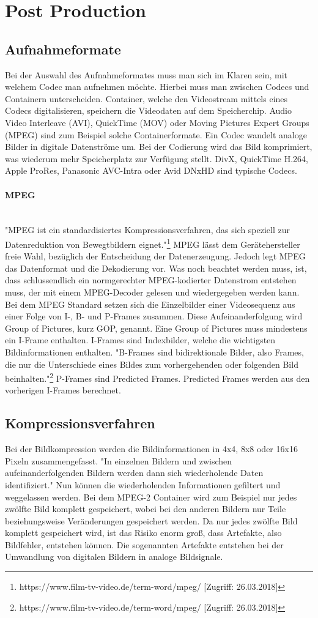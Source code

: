 \section{Post Production}
\subsection{Aufnahmeformate}
Bei der Auswahl des Aufnahmeformates muss man sich im Klaren sein, mit welchem Codec man aufnehmen möchte. Hierbei muss man zwischen Codecs und Containern unterscheiden. Container, welche den Videostream mittels eines Codecs digitalisieren, speichern die Videodaten auf dem Speicherchip. Audio Video Interleave (AVI), QuickTime (MOV) oder Moving Pictures Expert Groups (MPEG) sind zum Beispiel solche Containerformate. Ein Codec wandelt analoge Bilder in digitale Datenströme um. Bei der Codierung wird das Bild komprimiert, was wiederum mehr Speicherplatz zur Verfügung stellt. DivX, QuickTime H.264, Apple ProRes, Panasonic AVC-Intra oder Avid DNxHD sind typische Codecs. 
\paragraph{MPEG}
\leavevmode \\
"MPEG ist ein standardisiertes Kompressionsverfahren, das sich speziell zur Datenreduktion von Bewegtbildern eignet."\footnote{\label{}https://www.film-tv-video.de/term-word/mpeg/ [Zugriff: 26.03.2018]} MPEG lässt dem Gerätehersteller freie Wahl, bezüglich der Entscheidung der Datenerzeugung. Jedoch legt MPEG das Datenformat und die Dekodierung vor. Was noch beachtet werden muss, ist, dass schlussendlich ein normgerechter MPEG-kodierter Datenstrom entstehen muss, der mit einem MPEG-Decoder gelesen und wiedergegeben werden kann. Bei dem MPEG Standard setzen sich die Einzelbilder einer Videosequenz aus einer Folge von I-, B- und P-Frames zusammen. Diese Aufeinanderfolgung wird Group of Pictures, kurz GOP, genannt. Eine Group of Pictures muss mindestens ein I-Frame enthalten. I-Frames sind Indexbilder, welche die wichtigsten Bildinformationen enthalten. "B-Frames sind  bidirektionale Bilder, also Frames, die nur die Unterschiede eines Bildes zum vorhergehenden oder folgenden Bild beinhalten."\footnote{\label{}https://www.film-tv-video.de/term-word/mpeg/ [Zugriff: 26.03.2018]} P-Frames sind Predicted Frames. Predicted Frames werden aus den vorherigen I-Frames berechnet.
\subsection{Kompressionsverfahren}
Bei der Bildkompression werden die Bildinformationen in 4x4, 8x8 oder 16x16 Pixeln zusammengefasst. "In einzelnen Bildern und zwischen aufeinanderfolgenden Bildern werden dann sich wiederholende Daten identifiziert." Nun können die wiederholenden Informationen gefiltert und weggelassen werden. Bei dem MPEG-2 Container wird zum Beispiel nur jedes zwölfte Bild komplett gespeichert, wobei bei den anderen Bildern nur Teile beziehungsweise Veränderungen gespeichert werden. Da nur jedes zwölfte Bild komplett gespeichert wird, ist das Risiko enorm groß, dass Artefakte, also Bildfehler, entstehen können. Die sogenannten Artefakte entstehen bei der Umwandlung von digitalen Bildern in analoge Bildsignale. 
